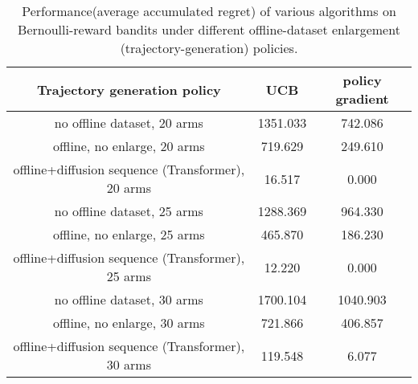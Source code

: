 \begin{table}[htbp]
    \centering
    \begin{tabular}{c c c}
    \toprule
    Trajectory generation policy & UCB & policy gradient \\
    \midrule
    no offline dataset, 20 arms & 1351.033 & 742.086 \\
    offline, no enlarge, 20 arms & 719.629 & 249.610 \\
    offline+diffusion sequence (Transformer), 20 arms & 16.517 & 0.000 \\
    no offline dataset, 25 arms & 1288.369 & 964.330 \\
    offline, no enlarge, 25 arms & 465.870 & 186.230 \\
    offline+diffusion sequence (Transformer), 25 arms & 12.220 & 0.000 \\
    no offline dataset, 30 arms & 1700.104 & 1040.903 \\
    offline, no enlarge, 30 arms & 721.866 & 406.857 \\
    offline+diffusion sequence (Transformer), 30 arms & 119.548 & 6.077 \\
    \bottomrule
\end{tabular}
\caption{Performance(average accumulated regret) of various algorithms on Bernoulli-reward bandits under different offline-dataset enlargement (trajectory-generation) policies.}
\label{table:non_bern}
\end{table}